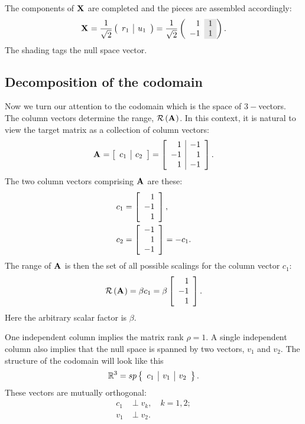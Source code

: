 The components of $\X{}$ are completed and the pieces are assembled accordingly:
\begin{equation}
  \X{} = \stwo
\left(
\begin{array}{c|c}
  r_{1} & u_{1}   
\end{array}
\right)
= \stwo
\left(
\begin{array}{ r >{\columncolor{ltgray}}r }
  1 & 1 \\
 -1 & 1
\end{array}
\right).
\end{equation}
The shading tags the null space vector.

\subsection{Decomposition of the codomain}\label{codomain}
Now we turn our attention to the codomain which is the space of $3-$vectors. The column vectors determine the range, $\rng{\A{}}$. In this context, it is natural to view the target matrix as a collection of column vectors:
\begin{equation}
  \A{} = \mat{c|c}{c_{1}&c_{2}} = \mat{r|r}{1&-1\\-1&1\\1&-1}.
\end{equation}
The two column vectors comprising $\A{}$ are these:
\begin{equation}
  \begin{split}
    c_{1} &= \mat{r}{1\\-1\\1},\\
    c_{2} &= \mat{r}{-1\\1\\-1} = -c_{1}.
  \end{split}
\end{equation}
The range of $\A{}$ is then the set of all possible scalings for the column vector $c_{1}$:
\begin{equation}
  \rng{\A{}} = \beta c_{1} = \beta \mat{r}{1\\-1\\1}.
\end{equation}
Here the arbitrary scalar factor is $\beta$.

One independent column implies the matrix rank $\rho = 1$. A single independent column also implies that the null space is spanned by two vectors, $v_{1}$ and $v_{2}$. The structure of the codomain will look like this
\begin{equation}
  \real{3}=sp\left\{ \begin{array}{c|c|c}c_{1}&v_{1}&v_{2}\end{array}\right\}.
\end{equation}
These vectors are mutually orthogonal:
\begin{equation}
  \begin{split}
    c_{1} &\perp v_{k}, \quad  k = 1,2;\\
    v_{1} &\perp v_{2}.
  \end{split}
\end{equation}

